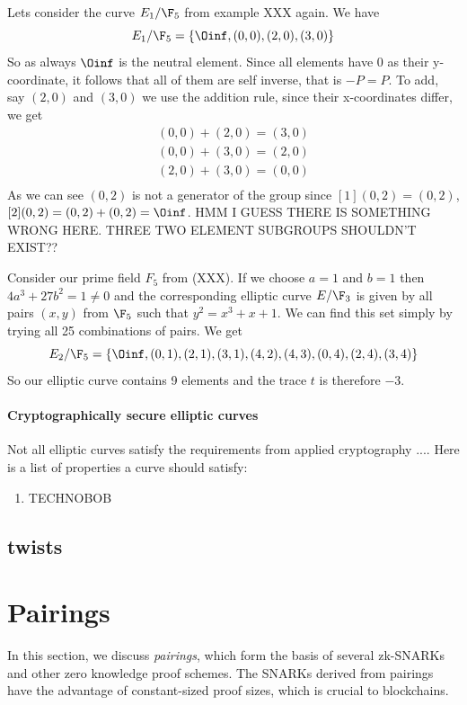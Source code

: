 \begin{example}Lets consider the curve $E_1/\F_5$ from example XXX again. We have 
$$
E_1/\F_5 = \{\Oinf, (0,0),(2,0),(3,0)\}
$$
So as always $\Oinf$ is the neutral element. Since all elements have $0$ as their y-coordinate, it follows that all of them are self inverse, that is $-P=P$. To add, say $(2,0)$ and $(3,0)$ we use the addition rule, since their x-coordinates differ, we get 
\begin{align*}
(0,0)+(2,0)= \left(3,0\right)\\
(0,0)+(3,0)= \left(2,0\right)\\
(2,0)+(3,0)= \left(0,0\right)\\ 
\end{align*}
As we can see $(0,2)$ is not a generator of the group since 
$[1](0,2)=(0,2)$, $[2](0,2)=(0,2)+(0,2)= \Oinf$. HMM I GUESS THERE IS SOMETHING WRONG HERE. THREE TWO ELEMENT SUBGROUPS SHOULDN'T EXIST??
\end{example}
\begin{example}Consider our prime field $F_5$ from (XXX). If we choose $a=1$ and $b=1$ then $4a^3+ 27b^2 = 1 \neq  0 $ and the corresponding elliptic curve $E/\F_{3}$ is given by all pairs $(x,y)$ from $\F_5$ such that $y^2=x^3+x+1$. We can find this set simply by trying all 25 combinations of pairs. We get
$$
E_2/\F_5 = \{\Oinf, (0,1),(2,1),(3,1),(4,2),(4,3),(0,4),(2,4),(3,4)\}
$$
So our elliptic curve contains 9 elements and the trace $t$ is therefore $-3$.
\end{example}


\paragraph{Cryptographically secure elliptic curves} Not all elliptic curves satisfy the requirements from applied cryptography .... Here is a list of properties a curve should satisfy:

\begin{enumerate}
\item TECHNOBOB
\end{enumerate}

\subsection{twists}

\section{Pairings}
In this section, we discuss \textit{pairings}, which form the basis of several zk-SNARKs and other zero knowledge proof schemes. The SNARKs derived from pairings have the advantage of constant-sized proof sizes, which is crucial to blockchains. 

